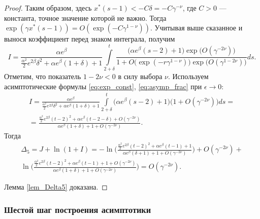 \begin{proof}
%
%
Таким образом, здесь $x^*(s - 1) < -C \delta = -C \gamma^{-\nu}$, где $C > 0$ --- константа, точное значение которой не важно. Тогда $\exp(\gamma x^*(s - 1))=O(\exp(-C \gamma^{1 - \nu}))$. Учитывая выше сказанное и вынося коэффициент перед знаком интеграла, получим  
\begin{equation*}
	I=\frac{\alpha e^\beta}
	{\frac{\alpha^2}{2}e^{2\beta}\delta^2+\alpha e^{\beta}(1+\delta)+1}
	\int\limits_{2 + \delta}^{t}
	\frac{\big(\alpha e^{\beta}(s-2)+1\big)\exp\big(O(\gamma^{-2\nu})\big)}
	{1+O\big(\exp({-r\gamma^{1-\nu}})\big) \exp\big(O(\gamma^{1-2\nu})\big)}
	ds. 
\end{equation*}
Отметим, что показатель $1-2\nu<0$ в силу выбора $\nu$. Используем асимптотические формулы \eqref{eq:exp_const}, \eqref{eq:asymp_frac} при $\epsilon \to 0$:
%
\begin{multline*}
	I=\frac{\alpha e^\beta}
	{\frac{\alpha^2}{2}e^{2\beta}\delta^2+\alpha e^{\beta}(1+\delta)+1}
	\int\limits_{2 + \delta}^{t}
	\big(\alpha e^{\beta}(s-2)+1\big)\big(1+O(\gamma^{-2\nu})\big)
	ds=
	\\
	= \frac{\frac{\alpha^2}{2} e^{2\beta}(t-2)^2+\alpha e^\beta(t-2-\delta)+O(\gamma^{-2\nu})}
	{\alpha e^{\beta}(1+\delta)+1+O(\gamma^{-2\nu})}.
\end{multline*}
%
Тогда
\begin{multline}
	\Delta_5=J+\ln(1+I)=
	-\ln\Big(\frac{\frac{\alpha^2}{2}e^{2\beta}(t-2)^2+\alpha e^{\beta}(t-1)+1}{\alpha e^{\beta}(\delta+1)+1+O(\gamma^{-2\nu})}\Big)+O(\gamma^{-2\nu})
	+
	\\
	\ln\Big(\frac{\frac{\alpha^2}{2} e^{2\beta}(t-2)^2+\alpha e^\beta(t - 1)+1+O(\gamma^{-2\nu})}
	{\alpha e^{\beta}(1+\delta)+1+O(\gamma^{-2\nu})}\Big)=O(\gamma^{-2\nu}).
\end{multline}        

Лемма \ref{lem_Delta5} доказана.

\end{proof}

\subsubsection{Шестой шаг построения асимптотики}

